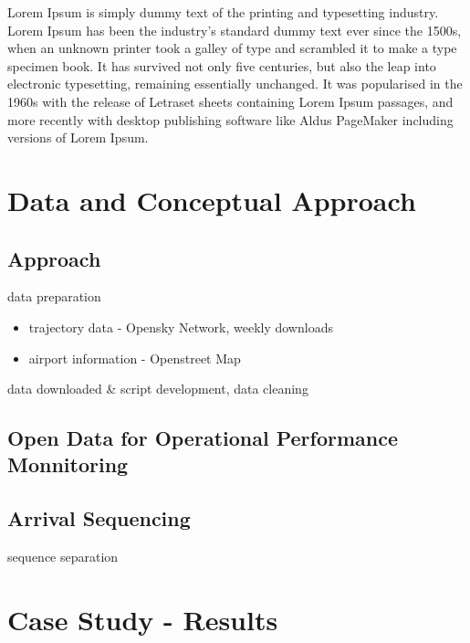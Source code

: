 \documentclass[letterpaper, 10 pt, journal, twoside]{IEEEtran}
\providecommand{\tightlist}{%
  \setlength{\itemsep}{0pt}\setlength{\parskip}{0pt}}\usepackage{longtable,booktabs,array}
\begin{document}
Lorem Ipsum is simply dummy text of the printing and typesetting
industry. Lorem Ipsum has been the industry's standard dummy text ever
since the 1500s, when an unknown printer took a galley of type and
scrambled it to make a type specimen book. It has survived not only five
centuries, but also the leap into electronic typesetting, remaining
essentially unchanged. It was popularised in the 1960s with the release
of Letraset sheets containing Lorem Ipsum passages, and more recently
with desktop publishing software like Aldus PageMaker including versions
of Lorem Ipsum.

\hypertarget{data-and-conceptual-approach}{%
\section{Data and Conceptual
Approach}\label{data-and-conceptual-approach}}

\hypertarget{approach}{%
\subsection{Approach}\label{approach}}

data preparation

\begin{itemize}
\tightlist
\item
  trajectory data - Opensky Network, weekly downloads
\item
  airport information - Openstreet Map
\end{itemize}

data downloaded \& script development, data cleaning

\hypertarget{open-data-for-operational-performance-monnitoring}{%
\subsection{Open Data for Operational Performance
Monnitoring}\label{open-data-for-operational-performance-monnitoring}}

\hypertarget{arrival-sequencing}{%
\subsection{Arrival Sequencing}\label{arrival-sequencing}}

sequence separation

\hypertarget{case-study---results}{%
\section{Case Study - Results}\label{case-study---results}}
\end{document}
